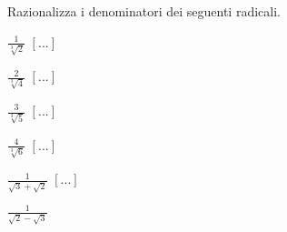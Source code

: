 \begin{esercizio}
 \label{ese:2.72}
Razionalizza i denominatori dei seguenti radicali.
 \begin{multicols}{4}
 \begin{enumeratea}
 \item \(\frac 1{\sqrt[3]2}\)
  \hfill \(\left[...\right]\)
 \item \(\frac 2{\sqrt[3]4}\)
  \hfill \(\left[...\right]\)
 \item \(\frac 3{\sqrt[3]5}\)
  \hfill \(\left[...\right]\)
 \item \(\frac 4{\sqrt[3]6}\)
  \hfill \(\left[...\right]\)
 \item \(\frac 1{\sqrt 3+\sqrt 2}\)
  \hfill \(\left[...\right]\)
 \item \(\frac 1{\sqrt 2-\sqrt 3}\)

\end{enumeratea}
\end{multicols}
\end{esercizio}
